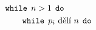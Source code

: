 \documentclass[preview]{standalone}
\begin{document}
\begin{align*}
\mathtt{while} & \:\: n > 1 \:\:  \mathtt{do}  \\&\hspace*{-6pt} \mathtt{while}  \:\: p_i \text{ dělí } n \:\:  \mathtt{do}
\end{align*}
\end{document}
